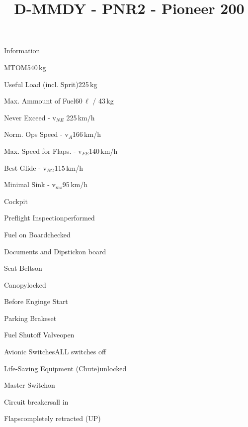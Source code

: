 \def\papersize{4}




\title{D-MMDY  -  PNR2  -  Pioneer 200}

\begin{checklist}{Information}
 	\item{MTOM}{540\,kg}
  	\item{Useful Load (incl. Sprit)}{225\,kg}
  	\item{Max. Ammount of Fuel}{60\,${\ell}$ / 43\,kg}
 	  \item{Never Exceed  -  v$_{NE}$ }{ 225\,km/h}
	  \item{Norm. Ops Speed  -  v$_{A}$}{166\,km/h}
	  \item{Max. Speed for Flaps.  -  v$_{FE}$}{140\,km/h}
	  \item{Best Glide  -  v$_{BG}$}{115\,km/h}
	  \item{Minimal Sink  -  v$_{ms}$}{95\,km/h}
\end{checklist}

\begin{checklist}{Cockpit}
	\item{Preflight Inspection}{performed}
	\item{Fuel on Board}{checked}
	\item{Documents and Dipstick}{on board}
	\item{Seat Belts}{on}
	\item{Canopy}{locked}
\end{checklist}

\begin{checklist}{Before Enginge Start}
	\item{Parking Brake}{set}
	\item{Fuel Shutoff Valve}{open}
	\item{Avionic Switches}{ALL switches off}
	\item{Life-Saving Equipment (Chute)}{unlocked}
	\item{Master Switch}{on}
	\item{Circuit breakers}{all in}
	\item{Flaps}{completely retracted (UP)}
    \vspace{2mm}
	\hspace{1mm}
\end{checklist}

